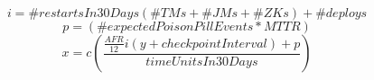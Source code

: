 \documentclass[preview]{standalone}
\begin{document}
\begin{equation}
	i = \# restartsIn30Days \left(\# TMs + \# JMs + \# ZKs\right) + \#deploys
\end{equation}
\begin{equation}
	p = \left(\# expectedPoisonPillEvents * MTTR\right)
\end{equation}
\begin{equation}
	x = c \left(\frac{\frac{AFR}{12} i \left(y + checkpointInterval\right) + p}{timeUnitsIn30Days}\right)
\end{equation}
\end{document}
